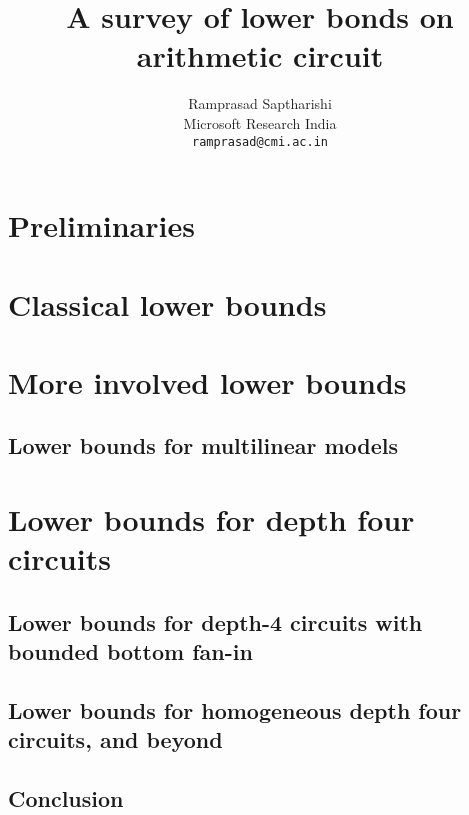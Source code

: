 \documentclass[12pt]{report}
\begin{document}
\title{A survey of lower bonds on arithmetic circuit}
\author{Ramprasad Saptharishi\\Microsoft Research India\\
{\tt ramprasad@cmi.ac.in}}
\maketitle 

\begin{abstract}
\lipsum[1-2]
\end{abstract}

\tableofcontents

\part{Preliminaries}









\part{Classical lower bounds}





\part{More involved lower bounds}



\chapter{Lower bounds for multilinear models}

\part{Lower bounds for depth four circuits}

\chapter{Lower bounds for depth-4 circuits with bounded bottom fan-in}

\chapter{Lower bounds for homogeneous depth four circuits, and beyond}

\chapter{Conclusion}




\end{document}
